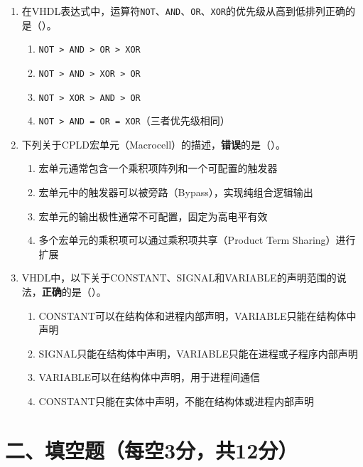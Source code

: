 \begin{enumerate}[label=\arabic*.]
\item 在VHDL表达式中，运算符\texttt{NOT}、\texttt{AND}、\texttt{OR}、\texttt{XOR}的优先级从高到低排列正确的是（\quad）。

\begin{enumerate}[label=\Alph*.]
  \item \texttt{NOT > AND > OR > XOR}
  \item \texttt{NOT > AND > XOR > OR}
  \item \texttt{NOT > XOR > AND > OR}
  \item \texttt{NOT > AND = OR = XOR}（三者优先级相同）
\end{enumerate}

\item 下列关于CPLD宏单元（Macrocell）的描述，\textbf{错误}的是（\quad）。

\begin{enumerate}[label=\Alph*.]
  \item 宏单元通常包含一个乘积项阵列和一个可配置的触发器
  \item 宏单元中的触发器可以被旁路（Bypass），实现纯组合逻辑输出
  \item 宏单元的输出极性通常不可配置，固定为高电平有效
  \item 多个宏单元的乘积项可以通过乘积项共享（Product Term Sharing）进行扩展
\end{enumerate}

\item VHDL中，以下关于CONSTANT、SIGNAL和VARIABLE的声明范围的说法，\textbf{正确}的是（\quad）。

\begin{enumerate}[label=\Alph*.]
  \item CONSTANT可以在结构体和进程内部声明，VARIABLE只能在结构体中声明
  \item SIGNAL只能在结构体中声明，VARIABLE只能在进程或子程序内部声明
  \item VARIABLE可以在结构体中声明，用于进程间通信
  \item CONSTANT只能在实体中声明，不能在结构体或进程内部声明
\end{enumerate}

\end{enumerate}

\section*{二、填空题（每空3分，共12分）}

